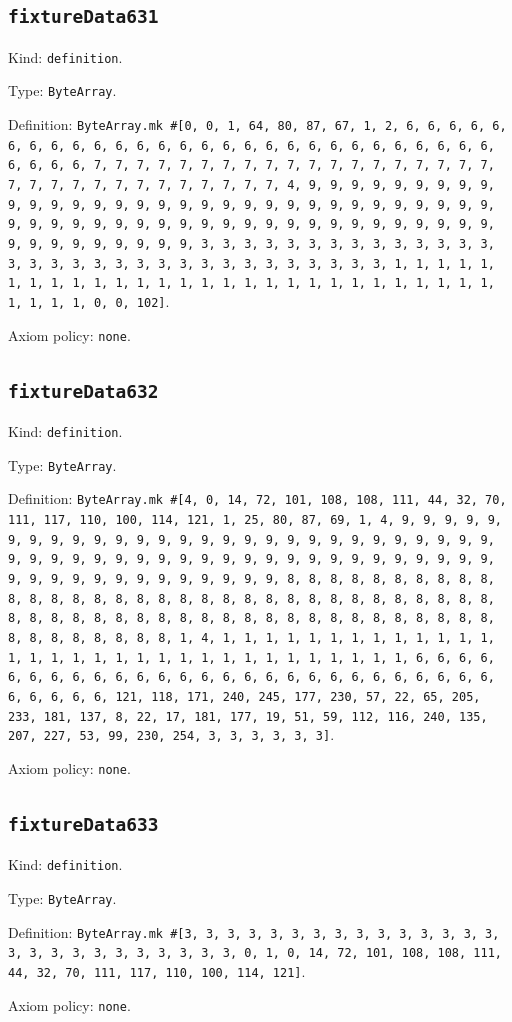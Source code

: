 \documentclass[11pt]{article}
\begin{document}
\subsection*{\texttt{fixtureData631}}
\noindent Kind: \texttt{definition}.\par
\noindent Type: \texttt{ByteArray}.\par
\noindent Definition: \texttt{ByteArray.mk \#[0, 0, 1, 64, 80, 87, 67, 1, 2, 6, 6, 6, 6, 6, 6, 6, 6, 6, 6, 6, 6, 6, 6, 6, 6, 6, 6, 6, 6, 6, 6, 6, 6, 6, 6, 6, 6, 6, 6, 6, 6, 7, 7, 7, 7, 7, 7, 7, 7, 7, 7, 7, 7, 7, 7, 7, 7, 7, 7, 7, 7, 7, 7, 7, 7, 7, 7, 7, 7, 7, 7, 7, 7, 4, 9, 9, 9, 9, 9, 9, 9, 9, 9, 9, 9, 9, 9, 9, 9, 9, 9, 9, 9, 9, 9, 9, 9, 9, 9, 9, 9, 9, 9, 9, 9, 9, 9, 9, 9, 9, 9, 9, 9, 9, 9, 9, 9, 9, 9, 9, 9, 9, 9, 9, 9, 9, 9, 9, 9, 9, 9, 9, 9, 9, 9, 9, 9, 9, 3, 3, 3, 3, 3, 3, 3, 3, 3, 3, 3, 3, 3, 3, 3, 3, 3, 3, 3, 3, 3, 3, 3, 3, 3, 3, 3, 3, 3, 3, 3, 3, 1, 1, 1, 1, 1, 1, 1, 1, 1, 1, 1, 1, 1, 1, 1, 1, 1, 1, 1, 1, 1, 1, 1, 1, 1, 1, 1, 1, 1, 1, 1, 1, 0, 0, 102]}.\par
\noindent Axiom policy: \texttt{none}.\par
\subsection*{\texttt{fixtureData632}}
\noindent Kind: \texttt{definition}.\par
\noindent Type: \texttt{ByteArray}.\par
\noindent Definition: \texttt{ByteArray.mk \#[4, 0, 14, 72, 101, 108, 108, 111, 44, 32, 70, 111, 117, 110, 100, 114, 121, 1, 25, 80, 87, 69, 1, 4, 9, 9, 9, 9, 9, 9, 9, 9, 9, 9, 9, 9, 9, 9, 9, 9, 9, 9, 9, 9, 9, 9, 9, 9, 9, 9, 9, 9, 9, 9, 9, 9, 9, 9, 9, 9, 9, 9, 9, 9, 9, 9, 9, 9, 9, 9, 9, 9, 9, 9, 9, 9, 9, 9, 9, 9, 9, 9, 9, 9, 9, 9, 9, 9, 8, 8, 8, 8, 8, 8, 8, 8, 8, 8, 8, 8, 8, 8, 8, 8, 8, 8, 8, 8, 8, 8, 8, 8, 8, 8, 8, 8, 8, 8, 8, 8, 8, 8, 8, 8, 8, 8, 8, 8, 8, 8, 8, 8, 8, 8, 8, 8, 8, 8, 8, 8, 8, 8, 8, 8, 8, 8, 8, 8, 8, 8, 8, 8, 1, 4, 1, 1, 1, 1, 1, 1, 1, 1, 1, 1, 1, 1, 1, 1, 1, 1, 1, 1, 1, 1, 1, 1, 1, 1, 1, 1, 1, 1, 1, 1, 1, 1, 6, 6, 6, 6, 6, 6, 6, 6, 6, 6, 6, 6, 6, 6, 6, 6, 6, 6, 6, 6, 6, 6, 6, 6, 6, 6, 6, 6, 6, 6, 6, 6, 121, 118, 171, 240, 245, 177, 230, 57, 22, 65, 205, 233, 181, 137, 8, 22, 17, 181, 177, 19, 51, 59, 112, 116, 240, 135, 207, 227, 53, 99, 230, 254, 3, 3, 3, 3, 3, 3]}.\par
\noindent Axiom policy: \texttt{none}.\par
\subsection*{\texttt{fixtureData633}}
\noindent Kind: \texttt{definition}.\par
\noindent Type: \texttt{ByteArray}.\par
\noindent Definition: \texttt{ByteArray.mk \#[3, 3, 3, 3, 3, 3, 3, 3, 3, 3, 3, 3, 3, 3, 3, 3, 3, 3, 3, 3, 3, 3, 3, 3, 3, 3, 0, 1, 0, 14, 72, 101, 108, 108, 111, 44, 32, 70, 111, 117, 110, 100, 114, 121]}.\par
\noindent Axiom policy: \texttt{none}.\par
\end{document}
